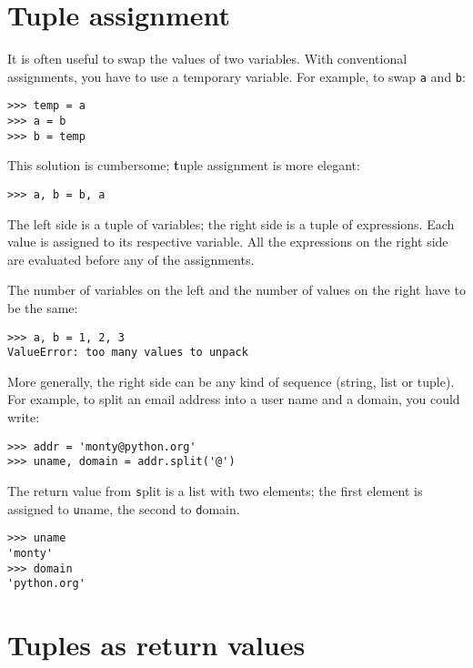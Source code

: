\documentclass[
DIV=11,
fontsize=13,
twoside,
headinclude=false,
titlepage=firstiscover,
abstract=true,
headsepline=true,
footsepline=true,
chapterprefix=true, %
headings=big,
bibliography=totoc,%
captions=tableheading
]{scrbook}
\theoremstyle{definition}
\begin{document}
\section{Tuple assignment}
\label{tuple.assignment}

It is often useful to swap the values of two variables.
With conventional assignments, you have to use a temporary
variable.  For example, to swap {\texttt a} and {\texttt b}:

\begin{lstlisting}
>>> temp = a
>>> a = b
>>> b = temp
\end{lstlisting}
%
This solution is cumbersome; {\textbf tuple assignment} is more elegant:

\begin{lstlisting}
>>> a, b = b, a
\end{lstlisting}
%
The left side is a tuple of variables; the right side is a tuple of
expressions.  Each value is assigned to its respective variable.  
All the expressions on the right side are evaluated before any
of the assignments.

The number of variables on the left and the number of
values on the right have to be the same:

\begin{lstlisting}
>>> a, b = 1, 2, 3
ValueError: too many values to unpack
\end{lstlisting}
%
More generally, the right side can be any kind of sequence
(string, list or tuple).  For example, to split an email address
into a user name and a domain, you could write:

\begin{lstlisting}
>>> addr = 'monty@python.org'
>>> uname, domain = addr.split('@')
\end{lstlisting}
%
The return value from {\texttt split} is a list with two elements;
the first element is assigned to {\texttt uname}, the second to
{\texttt domain}.

\begin{lstlisting}
>>> uname
'monty'
>>> domain
'python.org'
\end{lstlisting}
%

\section{Tuples as return values}
\end{document}
